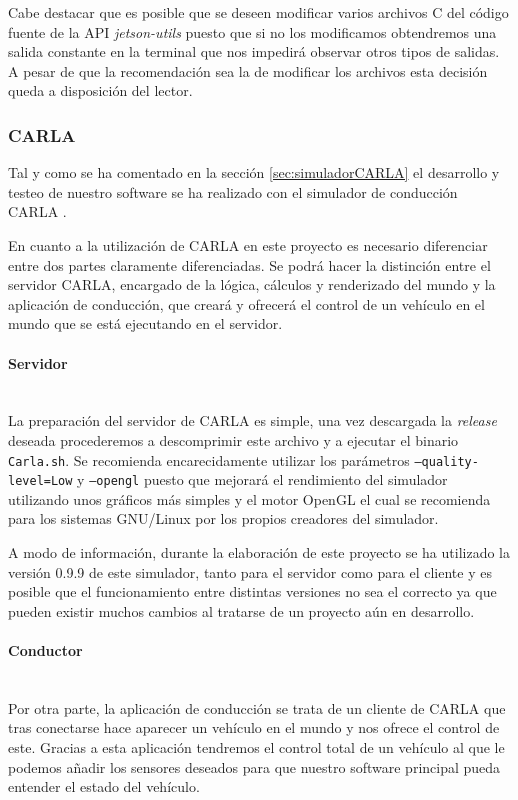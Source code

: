 Cabe destacar que es posible que se deseen modificar varios archivos C\+\+ del código fuente de la API \textit{jetson-utils} puesto que si no los modificamos obtendremos una salida constante en la terminal que nos impedirá observar otros tipos de salidas. 
A pesar de que la recomendación sea la de modificar los archivos esta decisión queda a disposición del lector.


\subsubsection{CARLA} \label{sec:preparacionCarla}
Tal y como se ha comentado en la sección \ref{sec:simuladorCARLA} el desarrollo y testeo de nuestro software se ha realizado con el simulador de conducción CARLA \cite{Dosovitskiy17}.

En cuanto a la utilización de CARLA en este proyecto es necesario diferenciar entre dos partes claramente diferenciadas.
Se podrá hacer la distinción entre el servidor CARLA, encargado de la lógica, cálculos y renderizado del mundo y la aplicación de conducción, que creará y ofrecerá el control de un vehículo en el mundo que se está ejecutando en el servidor.

\paragraph{Servidor}\mbox{}\\
La preparación del servidor de CARLA es simple, una vez descargada la \textit{release} deseada procederemos a descomprimir este archivo y a ejecutar el binario \texttt{Carla.sh}. Se recomienda encarecidamente utilizar los parámetros \texttt{--quality-level=Low} y \texttt{--opengl} puesto que mejorará el rendimiento del simulador utilizando unos gráficos más simples y el motor OpenGL el cual se recomienda para los sistemas GNU/Linux por los propios creadores del simulador\cite{carlaOpengl}.

A modo de información, durante la elaboración de este proyecto se ha utilizado la versión 0.9.9 de este simulador, tanto para el servidor como para el cliente y es posible que el funcionamiento entre distintas versiones no sea el correcto ya que pueden existir muchos cambios al tratarse de un proyecto aún en desarrollo.

\paragraph{Conductor}\mbox{}\\
Por otra parte, la aplicación de conducción se trata de un cliente de CARLA que tras conectarse hace aparecer un vehículo en el mundo y nos ofrece el control de este. Gracias a esta aplicación tendremos el control total de un vehículo al que le podemos añadir los sensores deseados para que nuestro software principal pueda entender el estado del vehículo.

